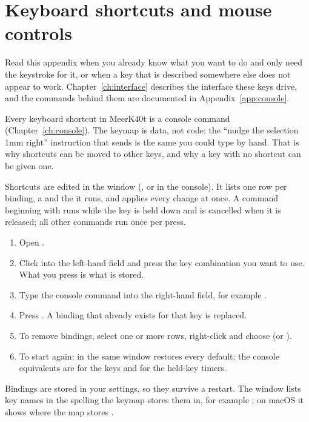 \chapter{Keyboard shortcuts and mouse controls}
\label{app:shortcuts}

Read this appendix when you already know what you want to do and only need the
keystroke for it, or when a key that is described somewhere else does not appear
to work. Chapter~\ref{ch:interface} describes the interface these keys drive,
and the commands behind them are documented in Appendix~\ref{app:console}.

Every keyboard shortcut in MeerK40t is a console command (Chapter~\ref{ch:console}).
The keymap is data, not code: the ``nudge the selection 1\unit{mm} right''
instruction that  sends is the same  you could
type by hand. That is why shortcuts can be moved to other keys, and why a key
with no shortcut can be given one.

Shortcuts are edited in the  window
(, or  in the console).
It lists one row per binding, a  and the  it runs,
and applies every change at once. A command beginning with \cmd{+} runs while
the key is held down and is cancelled when it is released; all other commands
run once per press.

\begin{tipbox}
\begin{enumerate}[label=\arabic*.,leftmargin=1.4em]
  \item Open .
  \item Click into the left-hand field and press the key combination you want to
        use. What you press is what is stored.
  \item Type the console command into the right-hand field, for example
        .
  \item Press . A binding that already exists for that key is
        replaced.
  \item To remove bindings, select one or more rows, right-click and choose
         (or ).
  \item To start again:  in the same
        window restores every default; the console equivalents are
         for the keys and  for the
        held-key timers.
\end{enumerate}
Bindings are stored in your settings, so they survive a restart. The
 window lists key names in the spelling the keymap stores them in,
for example ; on macOS it shows  where the map
stores .
\end{tipbox}

